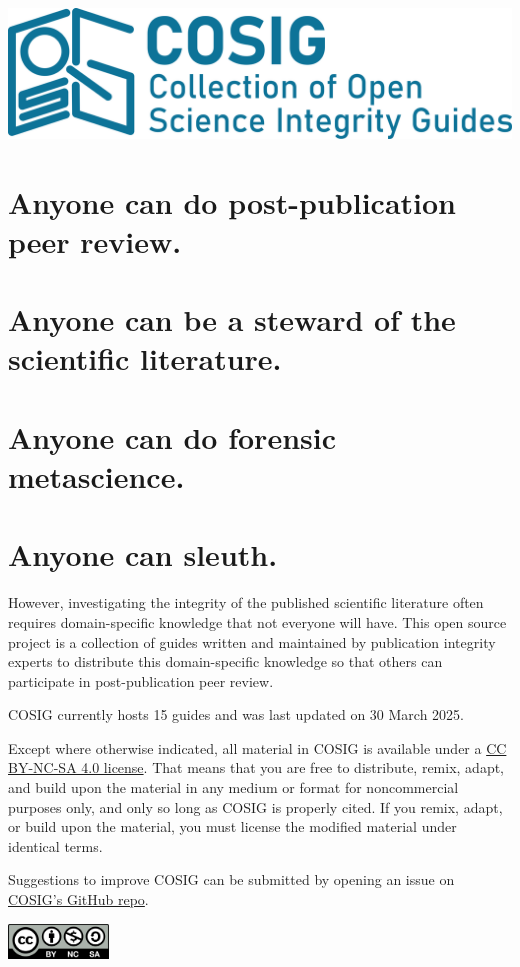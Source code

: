 \documentclass[letterpaper, 12pt]{article}
\begin{document}
\flushleft
\includegraphics[width=\textwidth]{img/home/241017_final_logo_mockup.png}

\section*{Anyone can do post-publication peer review.}
\section*{Anyone can be a steward of the scientific literature.}
\section*{Anyone can do forensic metascience.}
\section*{Anyone can sleuth.}

However, investigating the integrity of the published scientific literature often requires domain-specific knowledge that not everyone will have. This open source project is a collection of guides written and maintained by publication integrity experts to distribute this domain-specific knowledge so that others can participate in post-publication peer review.

COSIG currently hosts 15 guides and was last updated on 30 March 2025.

Except where otherwise indicated, all material in COSIG is available under a \href{https://creativecommons.org/licenses/by-nc-sa/4.0/deed.en}{CC BY-NC-SA 4.0 license}. That means that you are free to distribute, remix, adapt, and build upon the material in any medium or format for noncommercial purposes only, and only so long as COSIG is properly cited. If you remix, adapt, or build upon the material, you must license the modified material under identical terms.

Suggestions to improve COSIG can be submitted by opening an issue on \href{https://github.com/reeserich/cosig/issues}{COSIG's GitHub repo}.

\includegraphics[width=0.2\textwidth]{img/home/Cc-by-nc-sa_icon.svg.png}
\end{document}
